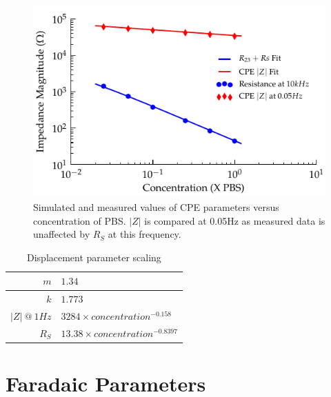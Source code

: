 \documentclass[journal, a4paper]{IEEEtran}
\begin{document}
{\begin{figure}
    \begin{center}
        \includegraphics{graphics/scalingFactors_Displacement_IEEE}
    \end{center}
    \caption{Simulated and measured values of CPE parameters versus concentration of PBS. $|Z|$ is compared at 0.05\thinspace Hz as measured data is unaffected by $R_{S}$ at this frequency.}
    \label{fig:CPE_Scaling}
\end{figure}

\begin{table}
    \begin{center}
        \begin{tabular}{|r|l|}
            \hline
            $m$ & $1.34$ \\ \hline
            $k$ & $1.773$\\ \hline
            $|Z|\: @\: 1Hz$& $3284 \times concentration^{-0.158}$ \\ \hline
            $R_{S}$ & $13.38 \times concentration^{-0.8397} $\\ \hline
        \end{tabular}
    \end{center}
    \caption{Displacement parameter scaling}
    \label{tab:CPEparams}
\end{table}

\section{Faradaic Parameters}

}
\end{document}
